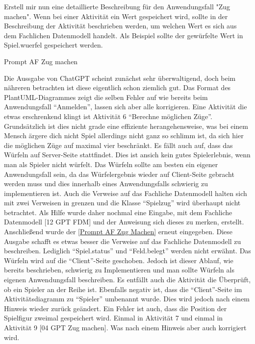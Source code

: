 \begin{prompt}[H]
    \begin{tcolorbox}[colback=gray!20, colframe=gray!20, boxrule=0pt, sharp corners] 
        Erstell mir nun eine detaillierte Beschreibung für den Anwendungsfall "Zug machen". Wenn bei einer Aktivität ein Wert gespeichert wird, sollte 
        in der Beschreibung der Aktivität beschrieben werden, um welchen Wert es sich aus dem Fachlichen Datenmodell handelt. Als Beispiel sollte der 
        gewürfelte Wert in Spiel.wuerfel gespeichert werden.
        \vfill
    \end{tcolorbox}
    \caption{Prompt AF Zug machen}
    \label{Prompt AF Zug Machen}
\end{prompt}

Die Aussgabe von ChatGPT scheint zunächst sehr überwaltigend, doch beim nähreren betrachten ist diese eigentlich schon ziemlich gut. Das Format des PlantUML-Diagrammes
zeigt die selben Fehler auf wie bereits beim Anwendungsfall ``Anmelden'', lassen sich aber alle korrigieren. Eine Aktivität die etwas erschrenkend klingt ist Aktivität 6 
``Berechne möglichen Züge''. Grundsätzlich ist dies nicht grade eine effiziente herangehensweise, was bei einem Mensch ärgere dich nicht Spiel allerdings nicht ganz so
schlimm ist, da sich hier die möglichen Züge auf maximal vier beschränkt. Es fällt auch auf, dass das Würfeln auf Server-Seite stattfindet. Dies ist ansich kein gutes 
Spielerlebnis, wenn man als Spieler nicht würfelt. Das 
Würfeln sollte am besten ein eigener Anwendungsfall sein, da das Würfelergebnis wieder auf Client-Seite gebracht werden muss und dies innerhalb eines Anwendungsfalls
schwierig zu implementieren ist. Auch die Verweise auf das Fachliche Datenmodell halten sich mit zwei Verweisen in grenzen und die Klasse ``Spielzug'' wird überhaupt nicht
betrachtet. Als Hilfe wurde daher nochmal eine Eingabe, mit dem Fachliche Datenmodell [12 GPT FDM] und der Anweisung sich dieses zu merken, erstellt. Anschließend wurde 
der \autoref{Prompt AF Zug Machen} erneut eingegeben. Diese Ausgabe schafft es etwas besser die Verweise auf das Fachliche Datenmodell zu beschreiben. Lediglich ``Spiel.status''
und ``Feld.belegt'' werden nicht erwähnt. Das Würfeln wird auf die ``Client''-Seite geschoben. Jedoch ist dieser Ablauf, wie bereits beschrieben, 
schwierig zu Implementieren und man sollte Würfeln als eigenen Anwendungsfall beschreiben. Es entfällt auch die Aktivität die Überprüft, ob ein Spieler an der Reihe ist. 
Ebenfalls negativ ist, dass die ``Client''-Seite im Aktivitätsdiagramm zu ``Spieler'' 
umbenannt wurde. Dies wird jedoch nach einem Hinweis wieder zurück geändert. Ein Fehler ist auch, dass die Position der Spielfigur zweimal gespeichert wird. Einmal in Aktivität 7
und einmal in Aktivität 9 [04 GPT Zug machen]. Was nach einem Hinweis aber auch korrigiert wird. %

